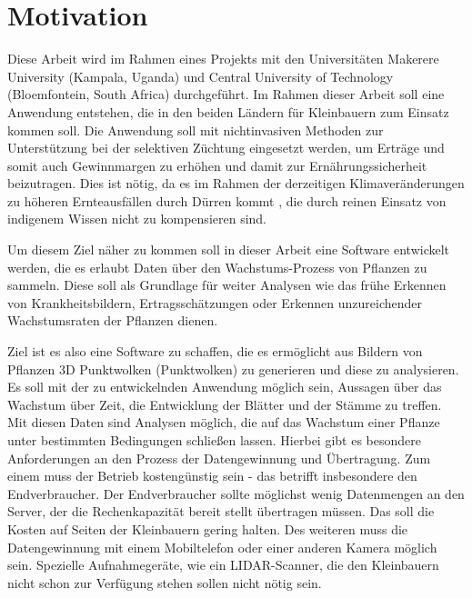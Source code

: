 \documentclass[12pt,titlepage, twoside]{article}
\begin{document}
\pagestyle{plain}
\tableofcontents
\newpage

\renewcommand{\labelenumi}{\alph{enumi})} 



\section{Motivation}
\label{sec:einleitung}
Diese Arbeit wird im Rahmen eines Projekts mit den Universitäten Makerere University (Kampala, Uganda) und Central University of Technology (Bloemfontein, South Africa) durchgeführt.
Im Rahmen dieser Arbeit soll eine Anwendung entstehen, die in den beiden Ländern für Kleinbauern zum Einsatz kommen soll.
Die Anwendung soll mit nichtinvasiven Methoden zur Unterstützung bei der selektiven Züchtung eingesetzt werden, um Erträge und somit auch Gewinnmargen zu erhöhen und damit zur Ernährungssicherheit beizutragen.
Dies ist nötig, da es im Rahmen der derzeitigen Klimaveränderungen zu höheren Ernteausfällen durch Dürren kommt \cite{droughts}, die durch reinen Einsatz von indigenem Wissen nicht zu kompensieren sind.

Um diesem Ziel näher zu kommen soll in dieser Arbeit eine Software entwickelt werden, die es erlaubt Daten über den Wachstums-Prozess von Pflanzen zu sammeln. 
Diese soll als Grundlage für weiter Analysen wie das frühe Erkennen von Krankheitsbildern, Ertragsschätzungen oder Erkennen unzureichender Wachstumsraten der Pflanzen dienen.

Ziel ist es also eine Software zu schaffen, die es ermöglicht aus Bildern von Pflanzen 3D Punktwolken (Punktwolken) zu generieren und diese zu analysieren.
Es soll mit der zu entwickelnden Anwendung möglich sein, Aussagen über das Wachstum über Zeit, die Entwicklung der Blätter und der Stämme zu treffen. 
Mit diesen Daten sind Analysen möglich, die auf das Wachstum einer Pflanze unter bestimmten Bedingungen schließen lassen.
Hierbei gibt es besondere Anforderungen an den Prozess der Datengewinnung und Übertragung. Zum einem muss der Betrieb kostengünstig sein - das betrifft insbesondere den Endverbraucher.
Der Endverbraucher sollte möglichst wenig Datenmengen an den Server, der die Rechenkapazität bereit stellt übertragen müssen. Das soll die Kosten auf Seiten der Kleinbauern gering halten.
Des weiteren muss die Datengewinnung mit einem Mobiltelefon oder einer anderen Kamera möglich sein. 
Spezielle Aufnahmegeräte, wie ein LIDAR-Scanner, die den Kleinbauern nicht schon zur Verfügung stehen sollen nicht nötig sein.
\end{document}
